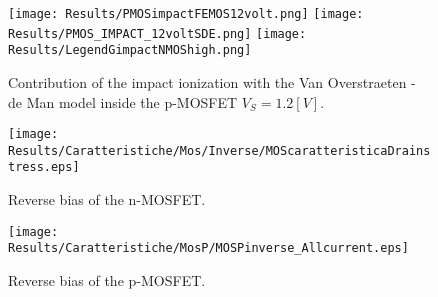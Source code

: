 \begin{figure}[!h]
\vspace{0.5cm}
\centering
{\texttt{[image: Results/PMOSimpactFEMOS12volt.png]}}
\hspace{0.04\textwidth}
{\texttt{[image: Results/PMOS\_IMPACT\_12voltSDE.png]}}
\hspace{0.04\textwidth}
{\texttt{[image: Results/LegendGimpactNMOShigh.png]}}
\caption{Contribution of the impact ionization with the Van Overstraeten - de Man model inside the p-MOSFET $V_S=1.2[V]$.}
\label{fig: II pMOS high}
\vspace{0.5cm}
\end{figure}







\begin{figure}[!h]
\texttt{[image: Results/Caratteristiche/Mos/Inverse/MOScaratteristicaDrainstress.eps]}
\caption{Reverse bias of the n-MOSFET.}
\label{fig: tutte le correnti mos stress}
\end{figure}



\vspace{1cm}



\begin{figure}[!h]
\texttt{[image: Results/Caratteristiche/MosP/MOSPinverse\_Allcurrent.eps]}
\caption{Reverse bias of the p-MOSFET.}
\label{fig: tutte le correnti Pmos stress}
\end{figure}









